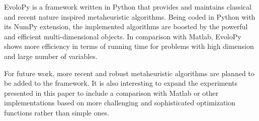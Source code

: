 \documentclass[a4paper,twoside]{article}
\begin{document}
EvoloPy is a framework written in Python that provides and maintains classical and recent nature inspired metaheuristic algorithms. Being coded in Python with its NumPy extension, the implemented algorithms are boosted by the powerful and efficient multi-dimensional objects. In comparison with Matlab, EvoloPy shows more efficiency in terms of running time for problems with  high dimension and large number of variables. 

For future work, more recent and robust metaheuristic algorithms are planned to be added to the framework. It is also interesting to expand the experiments presented in this paper to include a comparison with Matlab or other implementations based on more challenging and sophisticated optimization functions rather than simple ones. 





{\small
}
\end{document}
